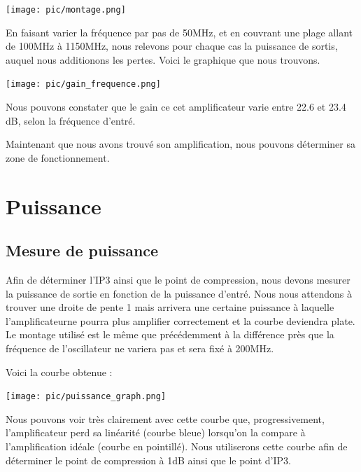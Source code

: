 \documentclass[a4paper,12pt]{report}            %
\begin{document}
\begin{center}\texttt{[image: pic/montage.png]}\\ \end{center}

En faisant varier la fréquence par pas de 50MHz, et en couvrant une plage allant de 100MHz à 1150MHz, 
nous relevons pour chaque cas la puissance de sortis, auquel nous additionons les pertes. Voici le graphique
que nous trouvons.

\begin{center}\texttt{[image: pic/gain\_frequence.png]}\\ \end{center}

Nous pouvons constater que le gain ce cet amplificateur varie entre 22.6 et 23.4 dB, selon la
fréquence d'entré. 

Maintenant que nous avons trouvé son amplification, nous pouvons déterminer sa zone de fonctionnement.

\chapter{Puissance}

\section{Mesure de puissance}

Afin de déterminer l'IP3 ainsi que le point de compression, nous devons mesurer la puissance de
sortie en fonction de la puissance d'entré. Nous nous attendons à trouver une droite de pente 1
mais arrivera une certaine puissance à laquelle l'amplificateurne pourra plus amplifier correctement 
et la courbe deviendra plate. Le montage utilisé est le même que précédemment à la différence près
que la fréquence de l'oscillateur ne variera pas et sera fixé à 200MHz.

Voici la courbe obtenue :

\begin{center}\texttt{[image: pic/puissance\_graph.png]}\\ \end{center}
    
Nous pouvons voir très clairement avec cette courbe que, progressivement, l'amplificateur perd sa linéarité
(courbe bleue) lorsqu'on la compare à l'amplification idéale (courbe en pointillé).
Nous utiliserons cette courbe afin de déterminer le point de compression à 1dB ainsi que le point d'IP3.
\end{document}
